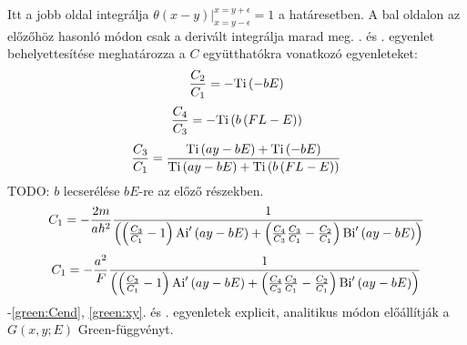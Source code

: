 Itt a jobb oldal integrálja $\left. \theta\left(x - y\right) \right\rvert_{x = y - \epsilon}^{x = y + \epsilon} = 1$ a határesetben. A bal oldalon az előzőhöz hasonló módon csak a derivált integrálja marad meg. . és . egyenlet behelyettesítése meghatározza a $C$ együtthatókra vonatkozó egyenleteket:
\begin{equation}
	\frac{C_2}{C_1} = -\mathrm{Ti}\left(-bE\right)
	\label{green:Cbegin}
\end{equation}
\begin{equation}
	\frac{C_4}{C_3} = -\mathrm{Ti}\left(b\left(FL - E\right)\right)
\end{equation}
\begin{equation}
	\frac{C_3}{C_1} = \frac{\mathrm{Ti}\left(ay - bE\right) + \mathrm{Ti}\left(-bE\right)}{\mathrm{Ti}\left(ay - bE\right) + \mathrm{Ti}\left(b\left(FL - E\right)\right)}
\end{equation}
TODO: $b$ lecserélése $bE$-re az előző részekben.
\begin{equation}
	C_1 = -\frac{2m}{a\hbar^2}\frac{1}{\left( \left(\frac{C_3}{C_1}-1\right)\mathrm{Ai}^\prime\left(ay - bE\right) + \left(\frac{C_4}{C_3}\frac{C_3}{C_1} - \frac{C_2}{C_1}\right) \mathrm{Bi}^\prime\left(ay - bE\right) \right)}
	\label{green:Cend}
\end{equation}
\begin{equation}
	C_1 = -\frac{a^2}{F}\frac{1}{\left( \left(\frac{C_3}{C_1}-1\right)\mathrm{Ai}^\prime\left(ay - bE\right) + \left(\frac{C_4}{C_3}\frac{C_3}{C_1} - \frac{C_2}{C_1}\right) \mathrm{Bi}^\prime\left(ay - bE\right) \right)}
\end{equation}
-\ref{green:Cend}, \ref{green:xy}. és . egyenletek explicit, analitikus módon előállítják a $G\left( x, y; E \right)$ Green-függvényt.
